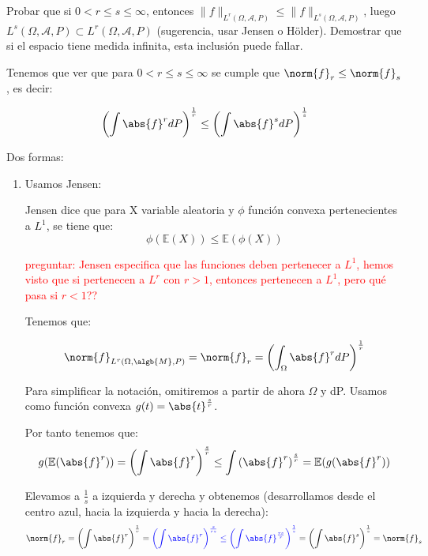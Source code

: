 \begin{problem}[8] Probar que si $0 < r\le s \le \infty$,
 entonces $\|f\|_{L^r(\Omega, \mathcal{A}, P)}\le \|f\|_{L^s(\Omega, \mathcal{A}, P)}$, luego $L^s(\Omega, \mathcal{A}, P) \subset L^r(\Omega, \mathcal{A}, P)$ (sugerencia, usar Jensen o H\"older). Demostrar que si el espacio tiene medida infinita, esta
inclusi\'on puede fallar.
\solution

\begin{expla}
Tenemos que ver que para $0 <r\leq s \leq \infty$ se cumple que $\norm{f}_r \leq \norm{f}_s$, es decir:

\[
\left( \int \abs{f}^r dP \right)^{\frac{1}{r}} \leq \left( \int \abs{f}^s dP \right)^{\frac{1}{s}}
\]



\end{expla}
Dos formas:
\begin{enumerate}
\item Usamos Jensen:

Jensen dice que para X variable aleatoria y $\phi$ función convexa pertenecientes a $L^1$, se tiene que:
\[
\phi(\mathbb{E}(X)) \leq \mathbb{E}(\phi(X))
\]

\textcolor{red}{preguntar: Jensen especifica que las funciones deben pertenecer a $L^1$, hemos visto que si pertenecen a $L^r$ con $r>1$, entonces pertenecen a $L^1$, pero qué pasa si $r<1$??}

Tenemos que:

\[
\norm{f}_{L^r(\Omega, \algb{M}, P)} = \norm{f}_r= \left( \int_{\Omega} \abs{f}^r dP \right)^{\frac{1}{r}}
\]

Para simplificar la notación, omitiremos a partir de ahora $\Omega$ y dP. Usamos como función convexa $g(t)=\abs{t}^{\frac{s}{r}}$.

Por tanto tenemos que:
\[
g(\mathbb{E}(\abs{f}^r)) = \left(\int \abs{f}^r\right)^{\frac{s}{r}} \leq\int \left( \abs{f}^r \right)^{\frac{s}{r}} = \mathbb{E}(g(\abs{f}^r)) 
\]

Elevamos a $\frac{1}{s}$ a izquierda y derecha y obtenemos (desarrollamos desde el centro azul, hacia la izquierda y hacia la derecha):
\[
\norm{f}_r = \left(\int \abs{f}^r\right)^{\frac{1}{r}} = \textcolor{blue}{\left(\int \abs{f}^r\right)^{\frac{s}{rs}} \leq \left(\int \abs{f}^{\frac{rs}{r}}\right)^{\frac{1}{s}}} = \left(\int \abs{f}^s\right)^{\frac{1}{s}} = \norm{f}_s
\]


\end{enumerate}
\end{problem}
